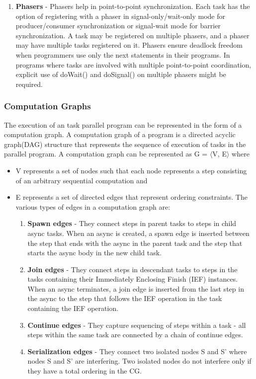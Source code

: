 \begin{enumerate}
\begin{enumerate}
\item \textbf{Phasers} - Phasers help in point-to-point synchronization. Each task has the option of registering with a phaser in signal-only/wait-only mode for producer/consumer synchronization or signal-wait mode for barrier synchronization. A task may be registered on multiple phasers, and a phaser may have multiple tasks registered on it. Phasers ensure deadlock freedom when programmers use only the next statements in their programs. In programs where tasks are involved with multiple point-to-point coordination, explicit use of doWait() and doSignal() on multiple phasers might be required.  
\end{enumerate}
\end{enumerate}

\subsubsection{Computation Graphs}
The execution of an task parallel program can be represented in the form of a computation graph. A computation graph of a program is a directed acyclic graph(DAG) structure that represents the sequence of execution of tasks in the parallel program. A computation graph can be represented as G = $\langle$V, E$\rangle$ where
\begin{itemize}
\item V represents a set of nodes such that  each node represents a step consisting of an arbitrary sequential computation and
\item E represents a set of directed edges that represent ordering constraints. The various types of edges in a computation graph are:
\begin{enumerate}
 \item \textbf{Spawn edges} - They connect steps in parent tasks to steps in child async tasks. When an async is created, a spawn edge is inserted between the step that ends with the async in the parent task and the step that starts the async body in the new child task.
\item \textbf{Join edges} - They connect steps in descendant tasks to steps in the tasks containing their Immediately Enclosing Finish (IEF) instances. When an async terminates, a join edge is inserted from the last step in the async to the step that follows the IEF operation in the task containing the IEF operation.
\item \textbf{Continue edges} - They capture sequencing of steps within a task - all steps within the same task are connected by a chain of continue edges.
\item \textbf{Serialization edges} - They connect two isolated nodes S and S' where nodes S and S' are interfering. Two isolated nodes do not interfere only if they have a total ordering in the CG.
 \end{enumerate} 
\end{itemize}

